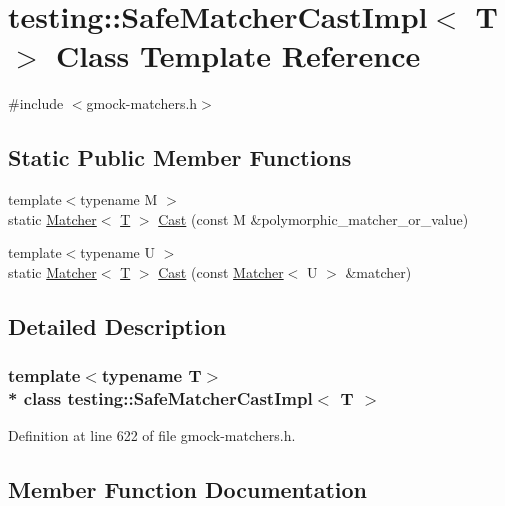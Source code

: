 \hypertarget{classtesting_1_1_safe_matcher_cast_impl}{}\section{testing\+:\+:Safe\+Matcher\+Cast\+Impl$<$ T $>$ Class Template Reference}
\label{classtesting_1_1_safe_matcher_cast_impl}


{\ttfamily \#include $<$gmock-\/matchers.\+h$>$}

\subsection*{Static Public Member Functions}
\begin{DoxyCompactItemize}
\item 
{\footnotesize template$<$typename M $>$ }\\static \hyperlink{classtesting_1_1_matcher}{Matcher}$<$ \hyperlink{functions__7_8js_adf1f3edb9115acb0a1e04209b7a9937b}{T} $>$ \hyperlink{classtesting_1_1_safe_matcher_cast_impl_a6ceab2bd71bff1677ed184eb2afa8653}{Cast} (const M \&polymorphic\+\_\+matcher\+\_\+or\+\_\+value)
\item 
{\footnotesize template$<$typename U $>$ }\\static \hyperlink{classtesting_1_1_matcher}{Matcher}$<$ \hyperlink{functions__7_8js_adf1f3edb9115acb0a1e04209b7a9937b}{T} $>$ \hyperlink{classtesting_1_1_safe_matcher_cast_impl_a034691f9eab929b8b25c33f13937ab95}{Cast} (const \hyperlink{classtesting_1_1_matcher}{Matcher}$<$ U $>$ \&matcher)
\end{DoxyCompactItemize}


\subsection{Detailed Description}
\subsubsection*{template$<$typename T$>$\\*
class testing\+::\+Safe\+Matcher\+Cast\+Impl$<$ T $>$}



Definition at line 622 of file gmock-\/matchers.\+h.



\subsection{Member Function Documentation}
